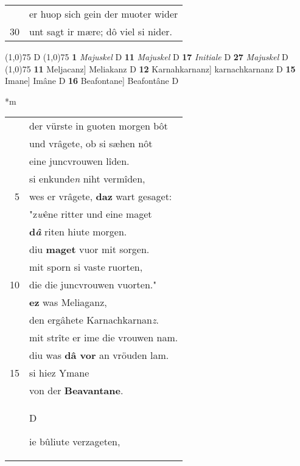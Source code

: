 \documentclass[8pt,a4paper,notitlepage]{article}
\begin{document}
\begin{table}[ht]
\begin{minipage}[t]{0.5\linewidth}
\begin{tabular}{rl}
 & er huop sich gein der muoter wider\\ 
30 & unt sagt ir mære; dô viel si nider.\\ 
\end{tabular}
\scriptsize
\line(1,0){75} \newline
D \newline
\line(1,0){75} \newline
\textbf{1} \textit{Majuskel} D  \textbf{11} \textit{Majuskel} D  \textbf{17} \textit{Initiale} D  \textbf{27} \textit{Majuskel} D  \newline
\line(1,0){75} \newline
\textbf{11} Meljacanz] Meliakanz D \textbf{12} Karnahkarnanz] karnachkarnanz D \textbf{15} Imane] Imâne D \textbf{16} Beafontane] Beafontâne D \newline
\end{minipage}
\hspace{0.5cm}
\begin{minipage}[t]{0.5\linewidth}
\small
\begin{center}*m
\end{center}
\begin{tabular}{rl}
 & der vürste in guoten morgen bôt\\ 
 & und vrâgete, ob si sæhen nôt\\ 
 & eine juncvrouwen lîden.\\ 
 & si enkunde\textit{n} niht vermîden,\\ 
5 & wes er vrâgete, \textbf{daz} wart gesaget:\\ 
 & "z\textit{w}êne ritter und eine maget\\ 
 & \textbf{d\textit{â}} riten hiute morgen.\\ 
 & diu \textbf{maget} vuor mit sorgen.\\ 
 & mit sporn si vaste ruorten,\\ 
10 & die die juncvrouwen vuorten."\\ 
 & \textbf{ez} was Meliaganz,\\ 
 & den ergâhete Karnachkarnan\textit{z}.\\ 
 & mit strîte er ime die vrouwen nam.\\ 
 & diu was \textbf{dâ vor} an vröuden lam.\\ 
15 & si hiez Ymane\\ 
 & von der \textbf{Beavantane}.\\ 
 & \begin{large}D\end{large}ie bûliute verzageten,\\ 

\end{tabular}
\end{minipage}
\end{table}
\end{document}

